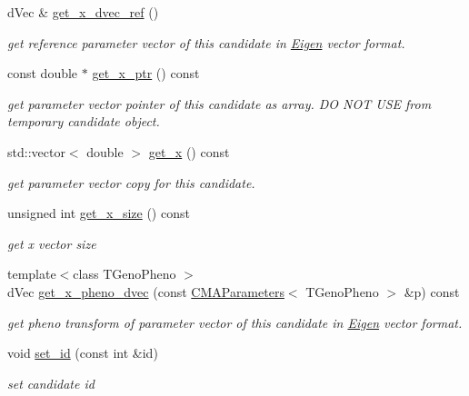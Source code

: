 \begin{DoxyCompactItemize}
d\+Vec \& \hyperlink{classlibcmaes_1_1Candidate_a2d007a084655a3d0f3176293f929bfdb}{get\+\_\+x\+\_\+dvec\+\_\+ref} ()
\begin{DoxyCompactList}\small\item\em get reference parameter vector of this candidate in \hyperlink{namespaceEigen}{Eigen} vector format. \end{DoxyCompactList}\item 
const double $\ast$ \hyperlink{classlibcmaes_1_1Candidate_ace56d764d7d88d5f11f96e9ee6cb775d}{get\+\_\+x\+\_\+ptr} () const 
\begin{DoxyCompactList}\small\item\em get parameter vector pointer of this candidate as array. D\+O N\+O\+T U\+S\+E from temporary candidate object. \end{DoxyCompactList}\item 
std\+::vector$<$ double $>$ \hyperlink{classlibcmaes_1_1Candidate_af6374f304455c3245913d03cfac221b7}{get\+\_\+x} () const 
\begin{DoxyCompactList}\small\item\em get parameter vector copy for this candidate. \end{DoxyCompactList}\item 
unsigned int \hyperlink{classlibcmaes_1_1Candidate_acafc0cd2e517e0edea82b3af7dea885f}{get\+\_\+x\+\_\+size} () const 
\begin{DoxyCompactList}\small\item\em get x vector size \end{DoxyCompactList}\item 
{\footnotesize template$<$class T\+Geno\+Pheno $>$ }\\d\+Vec \hyperlink{classlibcmaes_1_1Candidate_a99fac12003c21735f384322743c4dbf1}{get\+\_\+x\+\_\+pheno\+\_\+dvec} (const \hyperlink{classlibcmaes_1_1CMAParameters}{C\+M\+A\+Parameters}$<$ T\+Geno\+Pheno $>$ \&p) const 
\begin{DoxyCompactList}\small\item\em get pheno transform of parameter vector of this candidate in \hyperlink{namespaceEigen}{Eigen} vector format. \end{DoxyCompactList}\item 
void \hyperlink{classlibcmaes_1_1Candidate_aa0c3ad54c914f6bff4917e5cf65d20aa}{set\+\_\+id} (const int \&id)
\begin{DoxyCompactList}\small\item\em set candidate id \end{DoxyCompactList}\item 

\end{DoxyCompactItemize}
